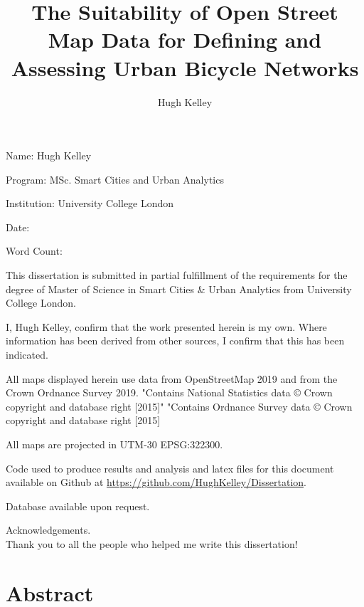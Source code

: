 \documentclass[hidelinks,11pt]{article} %
\title{The Suitability of Open Street Map Data for Defining and Assessing Urban Bicycle Networks}
\author{Hugh Kelley}
\begin{document}
\maketitle

\pagebreak


Name: Hugh Kelley

Program: MSc. Smart Cities and Urban Analytics

Institution: University College London

Date:

Word Count:

This dissertation is submitted in partial fulfillment of the requirements for the degree of Master of Science in Smart Cities \& Urban Analytics from University College London.

I, Hugh Kelley, confirm that the work presented herein is my own. Where information has been derived from other sources, I confirm that this has been indicated.
\pagebreak

All maps displayed herein use data from OpenStreetMap 2019 and from the Crown Ordnance Survey 2019.
"Contains National Statistics data © Crown copyright and database right [2015]"
"Contains Ordnance Survey data © Crown copyright and database right [2015]

\medskip
 
All maps are projected in UTM-30 EPSG:322300.

\medskip

Code used to produce results and analysis and latex files for this document available on Github at \url{https://github.com/HughKelley/Dissertation}. 

\medskip

Database available upon request. 

\pagebreak

Acknowledgements.\\

Thank you to all the people who helped me write this dissertation! 

\pagebreak

\section{Abstract} \label{abstract}


\pagebreak

\tableofcontents
\pagebreak

\listoffigures
\listoftables
\pagebreak
\end{document}
